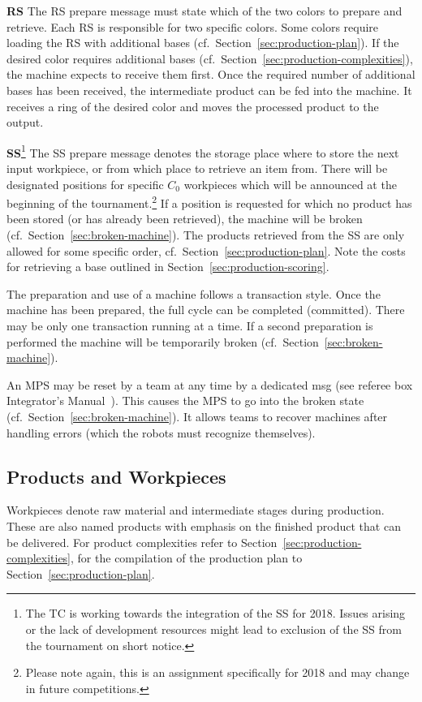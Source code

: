 \documentclass[12pt,twoside]{article}
\newcommand{\refsec}[1]{Section~\ref{#1}}
\begin{document}
\noindent\textbf{RS}
The RS prepare message must state which of the two colors to prepare and
retrieve. Each RS is responsible for two specific colors. Some colors
require loading the RS with additional bases
(cf.~\refsec{sec:production-plan}). If the desired color requires
additional bases (cf.~\refsec{sec:production-complexities}), the
machine expects to receive them first. Once the required number of
additional bases has been received, the intermediate product can be
fed into the machine. It receives a ring of the desired color and
moves the processed product to the output.

\noindent\textbf{SS}\footnote{The TC is working towards the
  integration of the SS for 2018. Issues arising or the lack of
  development resources might lead to exclusion of the SS from the
  tournament on short notice.}
%
The SS prepare message denotes the storage place where to store the
next input workpiece, or from which place to retrieve an item
from. There will be designated positions for specific $C_0$ workpieces
which will be announced at the beginning of the
tournament.\footnote{Please note again, this is an assignment
  specifically for 2018 and may change in future competitions.} If a
position is requested for which no product has been stored (or has
already been retrieved), the machine will be broken
(cf.~\refsec{sec:broken-machine}). The products retrieved from the SS
are only allowed for some specific order,
cf.~\refsec{sec:production-plan}. Note the costs for retrieving a base
outlined in \refsec{sec:production-scoring}.

\medskip
The preparation and use of a machine follows a transaction style. Once the
machine has been prepared, the full cycle can be completed (committed).
There may be only one transaction running at a time. If a
second preparation is performed the machine will
be temporarily broken (cf.~\refsec{sec:broken-machine}).

An MPS may be reset by a team at any time by a dedicated msg (see
referee box Integrator's Manual~\cite{RefBoxIntManual}). This causes
the MPS to go into the broken state
(cf.~\refsec{sec:broken-machine}). It allows teams to recover machines
after handling errors (which the robots must recognize themselves).

\subsection{Products and Workpieces}
\label{sec:products}
Workpieces denote raw material and intermediate stages during
production. These are also named products with emphasis on the
finished product that can be delivered. For product complexities refer
to \refsec{sec:production-complexities}, for the compilation of the
production plan to \refsec{sec:production-plan}.
\end{document}
